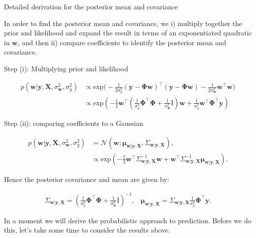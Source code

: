 \documentclass[11pt]{article}
\begin{document}
 Detailed derivation for the posterior mean and covariance

In order to find the posterior mean and covariance, we i) multiply
together the prior and likelihood and expand the result in terms of an
exponentiated quadratic in \(\mathbf{w}\), and then ii) compare
coefficients to identify the posterior mean and covariance.

Step (i): Multiplying prior and likelihood

\begin{align}
p(\mathbf{w}|\mathbf{y}, \mathbf{X}, \sigma_{\mathbf{w}}^2, \sigma_y^2) &\propto \text{exp}\big(-\frac{1}{2\sigma_y^2}(\mathbf{y} - \boldsymbol{\Phi}\mathbf{w})^\top (\mathbf{y} - \boldsymbol{\Phi}\mathbf{w}) -\frac{1}{2 \sigma_{\mathbf{w}}^2}\mathbf{w}^\top  \mathbf{w}  \big)\\
& \propto \text{exp}\left( - \frac{1}{2}\mathbf{w}^\top \left( \frac{1}{\sigma_y^2} \boldsymbol{\Phi}^\top \boldsymbol{\Phi} + \frac{1}{\sigma_{\mathbf{w}}^2} \mathrm{I} \right)\mathbf{w} + \frac{1}{\sigma_y^2} \mathbf{w}^\top \boldsymbol{\Phi}^\top \mathbf{y} \right) 
\end{align}

Step (ii): comparing coefficients to a Gaussian

\begin{align}
p(\mathbf{w}|\mathbf{y}, \mathbf{X}, \sigma_{\mathbf{w}}^2, \sigma_y^2) &= \mathcal{N}(\mathbf{w}; \mathbf{\mu}_{\mathbf{w} | \mathbf{y}, \mathbf{X} },\Sigma_{\mathbf{w} | \mathbf{y}, \mathbf{X} }), \\
& \propto \text{exp}\left( - \frac{1}{2}\mathbf{w}^\top \Sigma^{-1}_{\mathbf{w} | \mathbf{y}, \mathbf{X} }\mathbf{w} + \mathbf{w}^\top \Sigma^{-1}_{\mathbf{w} | \mathbf{y}, \mathbf{X} } \mathbf{\mu}_{\mathbf{w} | \mathbf{y}, \mathbf{X} } \right).
\end{align}

Hence the posterior covariance and mean are given by:

\begin{align}
\Sigma_{\mathbf{w} | \mathbf{y}, \mathbf{X} }  = \left( \frac{1}{\sigma_y^2} \boldsymbol{\Phi}^\top \boldsymbol{\Phi} + \frac{1}{\sigma_{\mathbf{w}}^2} \mathrm{I} \right)^{-1}, \;\;\;
\mathbf{\mu}_{\mathbf{w} | \mathbf{y}, \mathbf{X} } =  \Sigma_{\mathbf{w} | \mathbf{y}, \mathbf{X} } \frac{1}{\sigma_y^2}  \boldsymbol{\Phi}^\top \mathbf{y}.
\end{align}

In a moment we will derive the probabilistic approach to prediction.
Before we do this, let's take some time to consider the results above.
\end{document}
